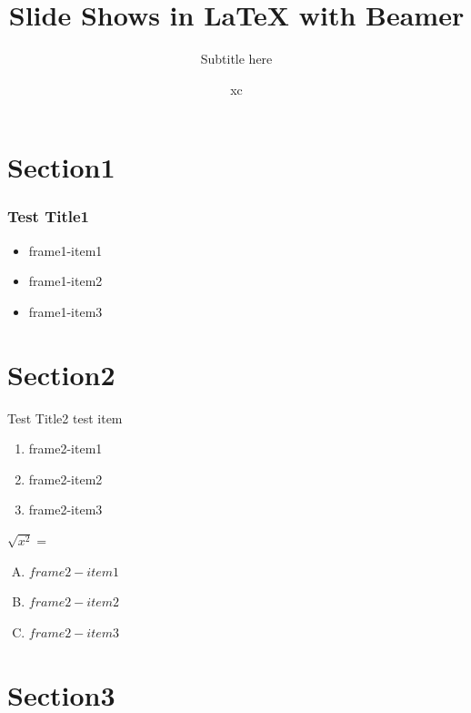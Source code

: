 \documentclass{beamer}
\title[short title]{Slide Shows in {\LaTeX} with Beamer}
\subtitle{Subtitle here}
\author{xc}
\institute{\large \textbf{Institute}: \\[6pt] word before is large and bold}
\begin{document}

\maketitle

\section{Section1}

\begin{frame}
    \frametitle{Test Title1}
    \titlepage
    \begin{itemize}
        \item frame1-item1\pause
        \item frame1-item2\pause
        \item frame1-item3
    \end{itemize}
\end{frame}

\section{Section2}

\begin{frame}[t]{Test Title2}\vspace{20pt}
    test item\pause
    \begin{enumerate}
        \item frame2-item1\pause
        \item frame2-item2\pause
        \item frame2-item3\pause
    \end{enumerate}
    \vspace{0.5em}
    $\sqrt{x^2}=$\\[10pt]
    \begin{enumerate}[(A)]
        \item $frame2-item1$
        \item $frame2-item2$
        \item $frame2-item3$
    \end{enumerate}
\end{frame}

\section{Section3}
\end{document}
